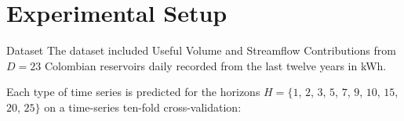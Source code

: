 \documentclass[10pt, xcolor=table]{beamer}
\newlength\figureheight
\newlength\figurewidth
\begin{document}
\section*{Experimental Setup}



\begin{frame}{Dataset}
    The dataset included Useful Volume and Streamflow Contributions from $D = 23$ Colombian reservoirs daily recorded from the last twelve years in kWh. 
    \begin{figure}[htpb]
        \centering 
        \setlength\figurewidth{\columnwidth}
        \setlength{}
        
    \end{figure}

    Each type of time series is predicted for the horizons $H=\{$$1$, $2$, $3$, $5$, $7$, $9$, $10$, $15$, $20$, $25$$\}$ on a time-series ten-fold cross-validation:
    \begin{figure}[htpb]
        \centering 
        \setlength\figurewidth{\columnwidth}
        \setlength{}
        
    \end{figure}
    
\end{frame}
\end{document}
